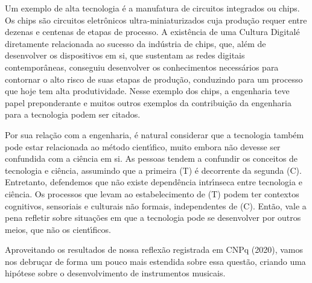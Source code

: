 \documentclass[
12pt,		%
openright,	%
twoside,  %
a4paper,			%
chapter=TITLE,		%
english,			%
french,				%
spanish,			%
brazil				%
]{USPSC-classe/USPSC}
\begin{document}
Um exemplo de alta tecnologia \'e a manufatura de circuitos integrados ou chips. Os chips s\~ao circuitos eletr\^onicos ultra-miniaturizados cuja produ\c{c}\~ao requer entre dezenas e centenas de etapas de processo. A exist\^encia de uma \textquotedbl Cultura Digital\textquotedbl  \'e diretamente relacionada ao sucesso da ind\'ustria de chips, que, al\'em de desenvolver os dispositivos em si, que sustentam as redes digitais contempor\^aneas, conseguiu desenvolver os conhecimentos necess\'arios para contornar o alto risco de suas etapas de produ\c{c}\~ao, conduzindo para um processo que hoje tem alta produtividade. Nesse exemplo dos chips, a engenharia teve papel preponderante e muitos outros exemplos da contribui\c{c}\~ao da engenharia para a tecnologia podem ser citados.









Por sua rela\c{c}\~ao com a engenharia, \'e natural considerar que a tecnologia tamb\'em pode estar relacionada ao m\'etodo cient\'{\i}fico, muito embora n\~ao devesse ser confundida com a ci\^encia em si. As pessoas tendem a confundir os conceitos de tecnologia e ci\^encia, assumindo que a primeira (T) \'e decorrente da segunda (C). Entretanto, defendemos que n\~ao existe depend\^encia intr\'{\i}nseca entre tecnologia e ci\^encia. Os processos que levam ao estabelecimento de (T) podem ter contextos cognitivos, sensoriais e culturais n\~ao formais, independentes de (C). Ent\~ao, vale a pena refletir sobre situa\c{c}\~oes em que a tecnologia pode se desenvolver por outros meios, que n\~ao os cient\'{\i}ficos.









Aproveitando os resultados de nossa reflex\~ao registrada em  CNPq (2020), vamos nos debru\c{c}ar de forma um pouco mais estendida sobre essa quest\~ao, criando uma hip\'otese sobre o desenvolvimento de instrumentos musicais.
\end{document}
